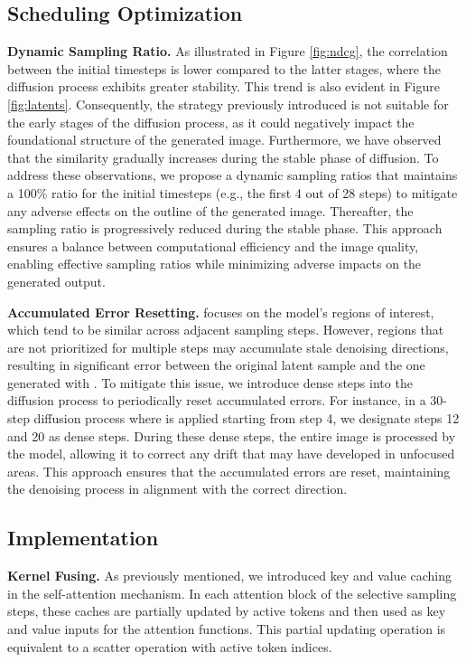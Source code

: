 \subsection{Scheduling Optimization}
\textbf{Dynamic Sampling Ratio.} As illustrated in Figure \ref{fig:ndcg}, the correlation between the initial timesteps is lower compared to the latter stages, where the diffusion process exhibits greater stability. This trend is also evident in Figure \ref{fig:latents}. Consequently, the strategy previously introduced is not suitable for the early stages of the diffusion process, as it could negatively impact the foundational structure of the generated image. Furthermore, we have observed that the similarity gradually increases during the stable phase of diffusion. To address these observations, we propose a dynamic sampling ratios that maintains a 100\% ratio for the initial timesteps (e.g., the first 4 out of 28 steps) to mitigate any adverse effects on the outline of the generated image. Thereafter, the sampling ratio is progressively reduced during the stable phase. This approach ensures a balance between computational efficiency and the image quality, enabling effective sampling ratios while minimizing adverse impacts on the generated output.



\noindent \textbf{Accumulated Error Resetting.} \ourmethod{} focuses on the model's regions of interest, which tend to be similar across adjacent sampling steps. However, regions that are not prioritized for multiple steps may accumulate stale denoising directions, resulting in significant error between the original latent sample and the one generated with \ourmethod{}. To mitigate this issue, we introduce dense steps into the \ourmethod{} diffusion process to periodically reset accumulated errors. For instance, in a 30-step diffusion process where \ourmethod{} is applied starting from step 4, we designate steps 12 and 20 as dense steps. During these dense steps, the entire image is processed by the model, allowing it to correct any drift that may have developed in unfocused areas. This approach ensures that the accumulated errors are reset, maintaining the denoising process in alignment with the correct direction.


\subsection{Implementation}

\textbf{Kernel Fusing.} As previously mentioned, we introduced key and value caching in the self-attention mechanism. In each attention block of the selective sampling steps, these caches are partially updated by active tokens and then used as key and value inputs for the attention functions. This partial updating operation is equivalent to a scatter operation with active token indices.

